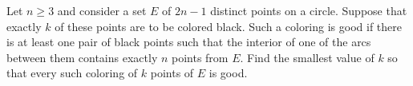 Let $ n \geq 3$ and consider a set $ E$ of $ 2n - 1$ distinct points on a circle. Suppose that exactly $ k$ of these points are to be colored black.  Such a coloring is good if there is at least one pair of black points such that the interior of one of the arcs between them contains exactly $ n$ points from $ E$.  Find the smallest value of $ k$ so that every such coloring of $ k$ points of $ E$ is good.